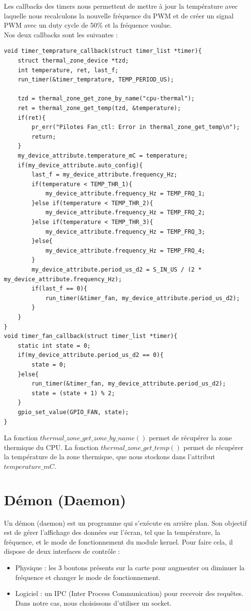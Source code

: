 \documentclass[
	a4paper, %
	10pt, %
]{CSUniSchoolLabReport}
\begin{document}
Les callbacks des timers nous permettent de mettre à jour la température avec laquelle nous recalculons la nouvelle fréquence du PWM et de créer un signal PWM avec un duty cycle de 50\% et la fréquence voulue. \\
Nos deux callbacks sont les suivantes :
\begin{lstlisting}[style=CStyle]
void timer_temprature_callback(struct timer_list *timer){
	struct thermal_zone_device *tzd;
	int temperature, ret, last_f;
	run_timer(&timer_temprature, TEMP_PERIOD_US);

	tzd = thermal_zone_get_zone_by_name("cpu-thermal");
	ret = thermal_zone_get_temp(tzd, &temperature);
	if(ret){
		pr_err("Pilotes Fan_ctl: Error in thermal_zone_get_temp\n");
		return;
	}
	my_device_attribute.temperature_mC = temperature;
	if(my_device_attribute.auto_config){
		last_f = my_device_attribute.frequency_Hz;
		if(temperature < TEMP_THR_1){
			my_device_attribute.frequency_Hz = TEMP_FRQ_1;
		}else if(temperature < TEMP_THR_2){
			my_device_attribute.frequency_Hz = TEMP_FRQ_2;
		}else if(temperature < TEMP_THR_3){
			my_device_attribute.frequency_Hz = TEMP_FRQ_3;
		}else{
			my_device_attribute.frequency_Hz = TEMP_FRQ_4;
		}
		my_device_attribute.period_us_d2 = S_IN_US / (2 * my_device_attribute.frequency_Hz);
		if(last_f == 0){
			run_timer(&timer_fan, my_device_attribute.period_us_d2);
		}
	}
}
void timer_fan_callback(struct timer_list *timer){
	static int state = 0;
	if(my_device_attribute.period_us_d2 == 0){
		state = 0;
	}else{
		run_timer(&timer_fan, my_device_attribute.period_us_d2);
		state = (state + 1) % 2;
	}
	gpio_set_value(GPIO_FAN, state);
}
\end{lstlisting}

La fonction $thermal\_zone\_get\_zone\_by\_name()$ permet de récupérer la zone thermique du CPU. La fonction $thermal\_zone\_get\_temp()$ permet de récupérer la température de la zone thermique, que nous stockons dans l'attribut $temperature\_mC$. \\

\section{Démon (Daemon)}\label{Démon (Daemon)}
Un démon (daemon) est un programme qui s'exécute en arrière plan. 
Son objectif est de gérer l'affichage des données sur l'écran, tel que la température, la fréquence, et le mode de fonctionnement du module kernel.
Pour faire cela, il dispose de deux interfaces de contrôle : \\
\begin{itemize}
	\item Physique : les 3 boutons présents sur la carte pour augmenter ou diminuer la fréquence et changer le mode de fonctionnement.
	\item Logiciel : un IPC (Inter Process Communication) pour recevoir des requêtes. Dans notre cas, nous choisissons d'utiliser un socket.
\end{itemize}
\end{document}
